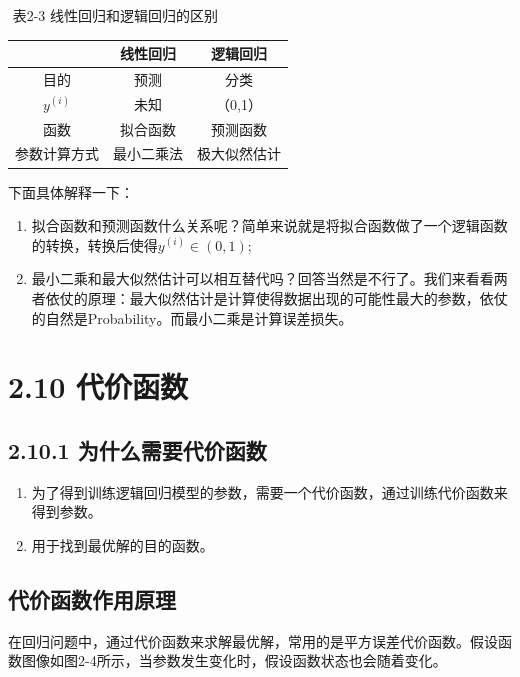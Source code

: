 ​ 表2-3 线性回归和逻辑回归的区别

\begin{longtable}[]{ccc}
\toprule
& 线性回归 & 逻辑回归\tabularnewline
\midrule
\endhead
目的 & 预测 & 分类\tabularnewline
$y^{(i)}$ & 未知 & （0,1）\tabularnewline
函数 & 拟合函数 & 预测函数\tabularnewline
参数计算方式 & 最小二乘法 & 极大似然估计\tabularnewline
 \bottomrule
\end{longtable}

下面具体解释一下：

\begin{enumerate}
\def\labelenumi{\arabic{enumi}.}
\item
  拟合函数和预测函数什么关系呢？简单来说就是将拟合函数做了一个逻辑函数的转换，转换后使得$y^{(i)} \in (0,1)$;
\item
  最小二乘和最大似然估计可以相互替代吗？回答当然是不行了。我们来看看两者依仗的原理：最大似然估计是计算使得数据出现的可能性最大的参数，依仗的自然是Probability。而最小二乘是计算误差损失。
\end{enumerate}

\section{2.10 代价函数}\label{ux4ee3ux4ef7ux51fdux6570}

\subsection{2.10.1
为什么需要代价函数}\label{ux4e3aux4ec0ux4e48ux9700ux8981ux4ee3ux4ef7ux51fdux6570}

\begin{enumerate}
\def\labelenumi{\arabic{enumi}.}
\item
  为了得到训练逻辑回归模型的参数，需要一个代价函数，通过训练代价函数来得到参数。
\item
  用于找到最优解的目的函数。
\end{enumerate}

\subsection{代价函数作用原理}\label{ux4ee3ux4ef7ux51fdux6570ux4f5cux7528ux539fux7406}

​
在回归问题中，通过代价函数来求解最优解，常用的是平方误差代价函数。假设函数图像如图2-4所示，当参数发生变化时，假设函数状态也会随着变化。

